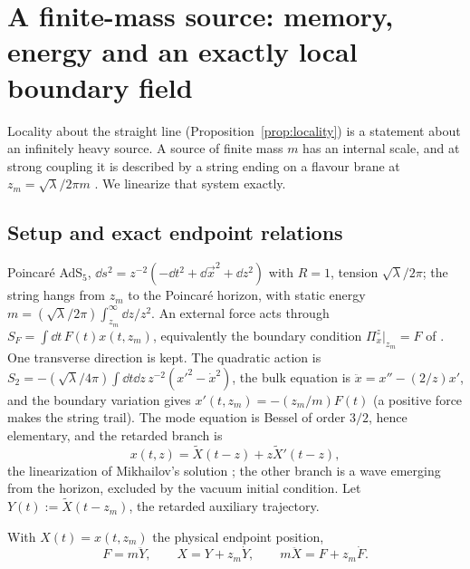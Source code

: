 \section{A finite-mass source: memory, energy and an exactly local boundary field}
\label{sec:finite-mass}

Locality about the straight line (Proposition~\ref{prop:locality}) is a statement about an infinitely heavy
source. A source of finite mass $m$ has an internal scale, and at strong coupling it is described by a string
ending on a flavour brane at $z_m=\sqrt\lambda/2\pi m$ \cite{CGGprl,CGGjhep}. We linearize that system exactly.

\subsection{Setup and exact endpoint relations}

Poincaré AdS$_5$, $\dd s^2=z^{-2}(-\dd t^2+\dd\vec x^2+\dd z^2)$ with $R=1$, tension $\sqrt\lambda/2\pi$; the string
hangs from $z_m$ to the Poincaré horizon, with static energy $m=(\sqrt\lambda/2\pi)\int_{z_m}^\infty\dd z/z^2$. An
external force acts through $S_F=\int\dd t\,F(t)x(t,z_m)$, equivalently the boundary condition $\Pi^z_x|_{z_m}=F$
of \cite{CGGprl}. One transverse direction is kept. The quadratic action is
$S_2=-(\sqrt\lambda/4\pi)\int\dd t\dd z\,z^{-2}(x'^2-\dot x^2)$, the bulk equation is $\ddot x=x''-(2/z)x'$, and the
boundary variation gives $x'(t,z_m)=-(z_m/m)F(t)$ (a positive force makes the string trail). The mode equation is
Bessel of order $3/2$, hence elementary, and the retarded branch is
\begin{equation}
x(t,z)=\tilde X(t-z)+z\tilde X'(t-z),
\end{equation}
the linearization of Mikhailov's solution \cite{Mikhailov}; the other branch is a wave emerging from the horizon,
excluded by the vacuum initial condition. Let $Y(t):=\tilde X(t-z_m)$, the retarded auxiliary trajectory.

\begin{proposition}
\label{prop:cgg}
With $X(t)=x(t,z_m)$ the physical endpoint position,
\begin{equation}
F=m\ddot Y,\qquad X=Y+z_m\dot Y,\qquad m\ddot X=F+z_m\dot F .
\label{eq:cgg}
\end{equation}
\end{proposition}

